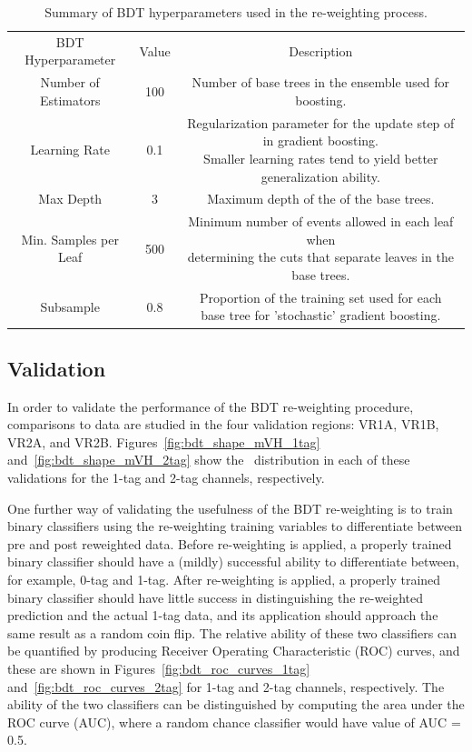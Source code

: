 \begin{table}[htbp!]
\centering
\begin{scriptsize}
\begin{tabular}{c|c|c}
\hline
BDT Hyperparameter & Value & Description \\
\hhline{|=|=|=|}
Number of Estimators & 100 & Number of base trees in the ensemble used for boosting. \\
\hline
Learning Rate & 0.1 & \makecell{Regularization parameter for the update step of in gradient boosting. \\ Smaller learning rates tend to yield better generalization ability.} \\
\hline
Max Depth & 3 & Maximum depth of the of the base trees. \\
\hline
Min. Samples per Leaf & 500 & \makecell{Minimum number of events allowed in each leaf when \\ determining the cuts that separate leaves in the base trees.} \\
\hline
Subsample & 0.8 & \makecell{Proportion of the training set used for each \\ base tree for 'stochastic' gradient boosting.} \\
\hline
\end{tabular}
\end{scriptsize}
\caption{Summary of BDT hyperparameters used in the re-weighting process.}
\label{tab:bdt_params}
\end{table}

\subsection{Validation}
\label{sec:bkg-validation}

In order to validate the performance of the BDT re-weighting procedure, comparisons to data are studied in the four validation regions: VR1A, VR1B, VR2A, and VR2B.
Figures~\ref{fig:bdt_shape_mVH_1tag} and~\ref{fig:bdt_shape_mVH_2tag} show the \mvh\ distribution in each of these validations for the 1-tag and 2-tag channels, respectively.

One further way of validating the usefulness of the BDT re-weighting is to train binary classifiers using the re-weighting training variables to differentiate between pre and post reweighted data.
Before re-weighting is applied, a properly trained binary classifier should have a (mildly) successful ability to differentiate between, for example, 0-tag and 1-tag.
After re-weighting is applied, a properly trained binary classifier should have little success in distinguishing the re-weighted prediction and the actual 1-tag data, and its application should approach the same result as a random coin flip.
The relative ability of these two classifiers can be quantified by producing Receiver Operating Characteristic (ROC) curves, and these are shown in Figures~\ref{fig:bdt_roc_curves_1tag} and~\ref{fig:bdt_roc_curves_2tag} for 1-tag and 2-tag channels, respectively.
The ability of the two classifiers can be distinguished by computing the area under the ROC curve (AUC), where a random chance classifier would have value of AUC = 0.5.

